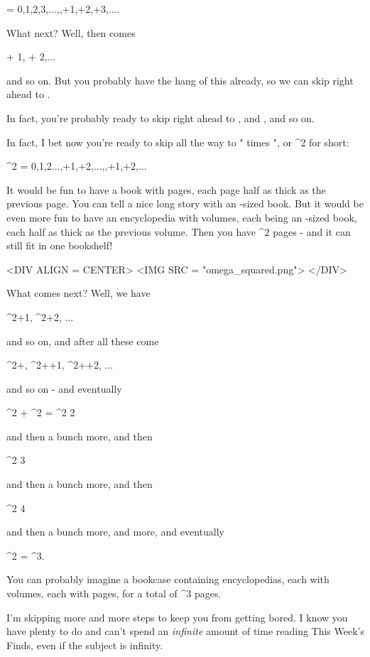  = {0,1,2,3,...,\omega ,\omega +1,\omega +2,\omega +3,....}

What next?  Well, then comes 

 + 1,  + 2,...

and so on.  But you probably have the hang of this already, so 
we can skip right ahead to .

In fact, you're probably ready to skip right ahead to ,
and , and so on.

In fact, I bet now you're ready to skip all the way to "\omega 
times \omega ", or \omega ^{2} for short:

\omega ^{2} = 
{0,1,2...\omega ,\omega +1,\omega +2,...,,+1,+2,...}

It would be fun to have a book with \omega  pages, each page half 
as thick as the previous page.  You can tell a nice long story 
with an \omega -sized book.  But it would be even more fun to have 
an encyclopedia with \omega  volumes, each being an \omega -sized book,
each half as thick as the previous volume.  Then you have \omega ^{2} 
pages - and it can still fit in one bookshelf!

<DIV ALIGN = CENTER>
<IMG SRC = "omega_squared.png">
</DIV>

What comes next?  Well, we have 

\omega ^{2}+1, \omega ^{2}+2, ...

and so on, and after all these come 

\omega ^{2}+\omega , \omega ^{2}+\omega +1, \omega ^{2}+\omega +2, ...

and so on - and eventually 

\omega ^{2} + \omega ^{2} = \omega ^{2} 2

and then a bunch more, and then

\omega ^{2} 3

and then a bunch more, and then

\omega ^{2} 4
 
and then a bunch more, and more, and eventually

\omega ^{2} \omega  = \omega ^{3}.

You can probably imagine a bookcase containing \omega  encyclopedias,
each with \omega  volumes, each with \omega  pages, for a total of
\omega ^{3} pages.

I'm skipping more and more steps to keep you from getting bored. 
I know you have plenty to do and can't spend an \emph{infinite} amount 
of time reading This Week's Finds, even if the subject is infinity.  

